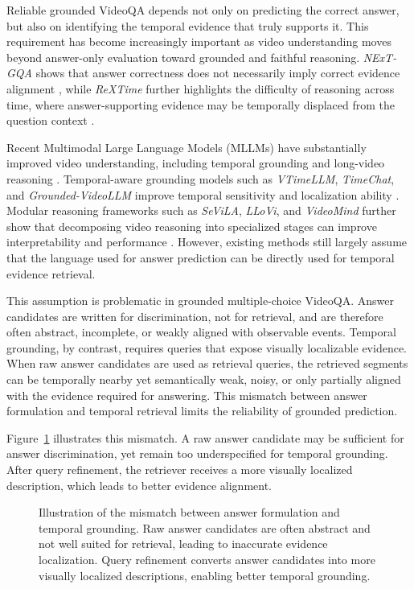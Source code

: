 Reliable grounded VideoQA depends not only on predicting the correct answer, but also on identifying the temporal evidence that truly supports it. This requirement has become increasingly important as video understanding moves beyond answer-only evaluation toward grounded and faithful reasoning. \emph{NExT-GQA} shows that answer correctness does not necessarily imply correct evidence alignment \cite{xiao2024can}, while \emph{ReXTime} further highlights the difficulty of reasoning across time, where answer-supporting evidence may be temporally displaced from the question context \cite{chen2024rextime}.

Recent Multimodal Large Language Models (MLLMs) have substantially improved video understanding, including temporal grounding and long-video reasoning \cite{tang2025video, wu2025survey_vtg_mllm}. Temporal-aware grounding models such as \emph{VTimeLLM}, \emph{TimeChat}, and \emph{Grounded-VideoLLM} improve temporal sensitivity and localization ability \cite{huang2024vtimellm, ren2024timechat, wang2025grounded_videollm}. Modular reasoning frameworks such as \emph{SeViLA}, \emph{LLoVi}, and \emph{VideoMind} further show that decomposing video reasoning into specialized stages can improve interpretability and performance \cite{yu2023sevila, zhang2024simple, liu2025videomind}. However, existing methods still largely assume that the language used for answer prediction can be directly used for temporal evidence retrieval.

This assumption is problematic in grounded multiple-choice VideoQA. Answer candidates are written for discrimination, not for retrieval, and are therefore often abstract, incomplete, or weakly aligned with observable events. Temporal grounding, by contrast, requires queries that expose visually localizable evidence. When raw answer candidates are used as retrieval queries, the retrieved segments can be temporally nearby yet semantically weak, noisy, or only partially aligned with the evidence required for answering. This mismatch between answer formulation and temporal retrieval limits the reliability of grounded prediction.

Figure~\ref{fig:mismatch_refinement} illustrates this mismatch. A raw answer candidate may be sufficient for answer discrimination, yet remain too underspecified for temporal grounding. After query refinement, the retriever receives a more visually localized description, which leads to better evidence alignment.

\begin{figure}[t]
    \centering
    
    \caption{Illustration of the mismatch between answer formulation and temporal grounding. Raw answer candidates are often abstract and not well suited for retrieval, leading to inaccurate evidence localization. Query refinement converts answer candidates into more visually localized descriptions, enabling better temporal grounding.}
    \label{fig:mismatch_refinement}
\end{figure}

